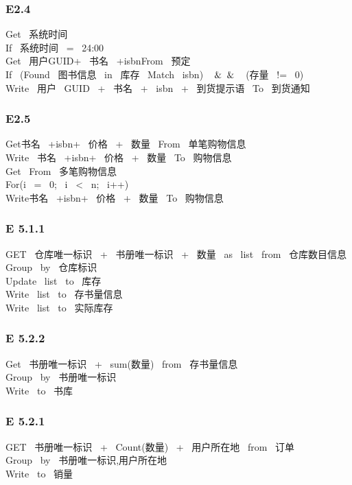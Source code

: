 \documentclass{article}
\begin{document}
\begin{CJK*}{UTF8}{gbsn}
\subsubsection*{E2.4}
Get \ 系统时间\\ 
If \ 系统时间 \ = \ 24:00\\ 
Get \ 用户GUID+ \ 书名 \ +isbnFrom \ 预定\\ 
If \ (Found \ 图书信息 \ in \ 库存 \ Match \ isbn) \ $\And\And$ \ (存量 \ != \ 0)\\ 
Write \ 用户 \ GUID \ + \ 书名 \ + \ isbn \ + \ 到货提示语 \ To \ 到货通知\\ 
\vspace{-1mm}
\subsubsection*{E2.5}
Get书名 \ +isbn+ \ 价格 \ + \ 数量 \ From \ 单笔购物信息 \\ 
Write \ 书名 \ +isbn+ \ 价格 \ + \ 数量 \ To \ 购物信息\\ 
Get \ From \ 多笔购物信息\\ 
For(i \ = \ 0; \ i \ < \ n; \ i++)\\ 
Write书名 \ +isbn+ \ 价格 \ + \ 数量 \ To \ 购物信息\\ 
\subsubsection*{E 5.1.1}
GET \ 仓库唯一标识 \ + \ 书册唯一标识 \ + \ 数量 \ as \ list \ from \ 仓库数目信息 \\ 
Group \ by \ 仓库标识\\ 
Update \ list \ to \ 库存\\ 
Write \ list \ to \ 存书量信息\\ 
Write \ list \ to \ 实际库存\\ 
\vspace{-1mm}
\subsubsection*{E 5.2.2}
Get \ 书册唯一标识 \ + \ sum(数量) \ from \ 存书量信息 \\ 
Group \ by \ 书册唯一标识\\ 
Write \ to \ 书库\\ 
\vspace{-1mm}
\subsubsection*{E 5.2.1}
GET \ 书册唯一标识 \ + \ Count(数量) \ + \ 用户所在地 \ from \ 订单 \\ 
Group \ by \ 书册唯一标识,用户所在地\\ 
Write \ to \ 销量\\ 
\vspace{-1mm}

\end{CJK*}
\end{document}
